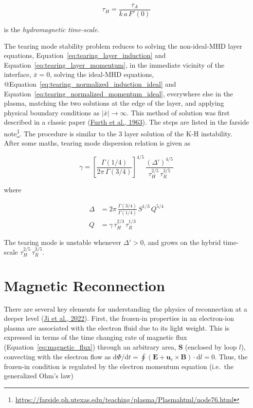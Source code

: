 \documentclass[
  notoc %
]{tufte-book}
\DeclareRobustCommand{\href}[2]{#2\footnote{\url{#1}}}
\begin{document}
\[
\tau_H = \frac{\tau_A}{k\,a\,F'(0)}
\]

is the \emph{hydromagnetic time-scale}.

The tearing mode stability problem reduces to solving the non-ideal-MHD
layer equations, Equation~\ref{eq:tearing_layer_induction} and
Equation~\ref{eq:tearing_layer_momentum}, in the immediate vicinity of
the interface, \(\bar{x}=0\), solving the ideal-MHD equations,
@Equation~\ref{eq:tearing_normalized_induction_ideal} and
Equation~\ref{eq:tearing_normalized_momentum_ideal}, everywhere else in
the plasma, matching the two solutions at the edge of the layer, and
applying physical boundary conditions as
\(\vert\bar{x}\vert\rightarrow\infty\). This method of solution was
first described in a classic paper
(\protect\hyperlink{ref-furth1963finite}{Furth et al., 1963}). The steps
are listed in the
\href{https://farside.ph.utexas.edu/teaching/plasma/Plasmahtml/node76.html}{farside
note}. The procedure is similar to the 3 layer solution of the K-H
instability. After some maths, tearing mode dispersion relation is given
as

\[
\gamma = \left[\frac{{\Gamma}(1/4)}{2\pi\,{\Gamma}(3/4)}\right]^{4/5}\, \frac{({\Delta}')^{4/5}}{\tau_H^{2/5}\,\tau_R^{3/5}}
\]

where

\[
\begin{aligned}
{\Delta} &= 2\pi\,\frac{{\Gamma}(3/4)}{{\Gamma}(1/4)}\,S^{1/3}\, Q^{5/4} \\
Q &= \gamma\,\tau_H^{2/3}\,\tau_R^{1/3}
\end{aligned}
\]

The tearing mode is unstable whenever \({\Delta}'>0\), and grows on the
hybrid time-scale \(\tau_H^{2/5}\,\tau_R^{3/5}\).

\hypertarget{sec:reconnection}{%
\section{Magnetic Reconnection}\label{sec:reconnection}}

There are several key elements for understanding the physics of
reconnection at a deeper level
(\protect\hyperlink{ref-ji2022magnetic}{Ji et al., 2022}). First, the
frozen-in properties in an electron-ion plasma are associated with the
electron fluid due to its light weight. This is expressed in terms of
the time changing rate of magnetic flux
(Equation~\ref{eq:magnetic_flux}) through an arbitrary area,
\(\mathbf{S}\) (enclosed by loop \(l\)), convecting with the electron
flow as
\(\mathrm{d}\Phi/\mathrm{d}t = \oint(\mathbf{E}+\mathbf{u}_e\times\mathbf{B})\cdot\mathrm{d}l = 0\).
Thus, the frozen-in condition is regulated by the electron momentum
equation (i.e.~the generalized Ohm's law)
\end{document}
